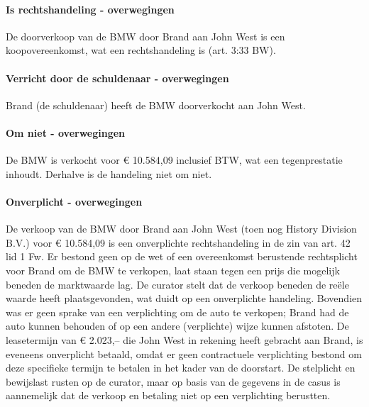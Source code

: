 \documentclass[
  dutch,
  a4paper,
]{article}
\begin{document}
\paragraph{Is rechtshandeling - overwegingen}\label{is-rechtshandeling---overwegingen-54}

De doorverkoop van de BMW door Brand aan John West is een koopovereenkomst, wat een rechtshandeling is (art. 3:33 BW).

\paragraph{Verricht door de schuldenaar - overwegingen}\label{verricht-door-de-schuldenaar---overwegingen-54}

Brand (de schuldenaar) heeft de BMW doorverkocht aan John West.

\paragraph{Om niet - overwegingen}\label{om-niet---overwegingen-54}

De BMW is verkocht voor € 10.584,09 inclusief BTW, wat een tegenprestatie inhoudt. Derhalve is de handeling niet om niet.

\paragraph{Onverplicht - overwegingen}\label{onverplicht---overwegingen-54}

De verkoop van de BMW door Brand aan John West (toen nog History Division B.V.) voor € 10.584,09 is een onverplichte rechtshandeling in de zin van art. 42 lid 1 Fw. Er bestond geen op de wet of een overeenkomst berustende rechtsplicht voor Brand om de BMW te verkopen, laat staan tegen een prijs die mogelijk beneden de marktwaarde lag. De curator stelt dat de verkoop beneden de reële waarde heeft plaatsgevonden, wat duidt op een onverplichte handeling. Bovendien was er geen sprake van een verplichting om de auto te verkopen; Brand had de auto kunnen behouden of op een andere (verplichte) wijze kunnen afstoten. De leasetermijn van € 2.023,-- die John West in rekening heeft gebracht aan Brand, is eveneens onverplicht betaald, omdat er geen contractuele verplichting bestond om deze specifieke termijn te betalen in het kader van de doorstart. De stelplicht en bewijslast rusten op de curator, maar op basis van de gegevens in de casus is aannemelijk dat de verkoop en betaling niet op een verplichting berustten.
\end{document}
